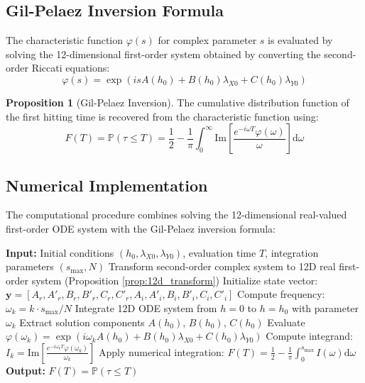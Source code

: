 \documentclass{article}
\renewcommand{\P}{\mathbb{P}}
\newcommand{\diff}{\mathrm{d}}
\theoremstyle{definition}
\newtheorem{proposition}{Proposition}[section]
\begin{document}
\subsection{Gil-Pelaez Inversion Formula}

The characteristic function $\varphi(s)$ for complex parameter $s$ is evaluated by solving the 12-dimensional first-order system obtained by converting the second-order Riccati equations:
\begin{equation}
\varphi(s) = \exp\!\left( is A(h_0) + B(h_0)\lambda_{X0} + C(h_0)\lambda_{Y0} \right)
\end{equation}

\begin{proposition}[Gil-Pelaez Inversion]
\label{prop:gilpelaez}
The cumulative distribution function of the first hitting time is recovered from the characteristic function using:
\begin{equation}
F(T) = \P(\tau \leq T) = \frac{1}{2} - \frac{1}{\pi} \int_0^{\infty} \text{Im}\left[\frac{e^{-i\omega T} \varphi(\omega)}{\omega}\right] \diff\omega \label{eq:gilpelaez_inversion}
\end{equation}
\end{proposition}

\subsection{Numerical Implementation}

The computational procedure combines solving the 12-dimensional real-valued first-order ODE system with the Gil-Pelaez inversion formula:

\begin{algorithm}
\caption{First Hitting Time Distribution via Gil-Pelaez Inversion}
\begin{algorithmic}[1]
\STATE \textbf{Input:} Initial conditions $(h_0, \lambda_{X0}, \lambda_{Y0})$, evaluation time $T$, integration parameters $(s_{\max}, N)$
\STATE Transform second-order complex system to 12D real first-order system (Proposition \ref{prop:12d_transform})
\STATE Initialize state vector: $\mathbf{y} = [A_r, A'_r, B_r, B'_r, C_r, C'_r, A_i, A'_i, B_i, B'_i, C_i, C'_i]$
    \STATE Compute frequency: $\omega_k = k \cdot s_{\max} / N$
    \STATE Integrate 12D ODE system from $h = 0$ to $h = h_0$ with parameter $\omega_k$
    \STATE Extract solution components $A(h_0)$, $B(h_0)$, $C(h_0)$
    \STATE Evaluate $\varphi(\omega_k) = \exp(i\omega_k A(h_0) + B(h_0)\lambda_{X0} + C(h_0)\lambda_{Y0})$
    \STATE Compute integrand: $I_k = \text{Im}\left[\frac{e^{-i\omega_k T} \varphi(\omega_k)}{\omega_k}\right]$
\ENDFOR
\STATE Apply numerical integration: $F(T) = \frac{1}{2} - \frac{1}{\pi} \int_0^{s_{\max}} I(\omega) \diff\omega$
\STATE \textbf{Output:} $F(T) = \P(\tau \leq T)$
\end{algorithmic}
\end{algorithm}
\end{document}
